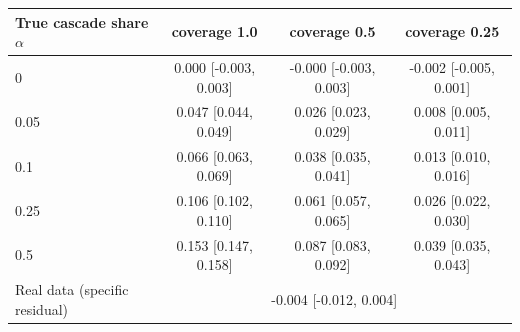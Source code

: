 \begin{tabular}{lccc}
\toprule
True cascade share $\alpha$ & coverage 1.0 & coverage 0.5 & coverage 0.25 \\
\midrule
0 & 0.000 [-0.003, 0.003] & -0.000 [-0.003, 0.003] & -0.002 [-0.005, 0.001] \\
0.05 & 0.047 [0.044, 0.049] & 0.026 [0.023, 0.029] & 0.008 [0.005, 0.011] \\
0.1 & 0.066 [0.063, 0.069] & 0.038 [0.035, 0.041] & 0.013 [0.010, 0.016] \\
0.25 & 0.106 [0.102, 0.110] & 0.061 [0.057, 0.065] & 0.026 [0.022, 0.030] \\
0.5 & 0.153 [0.147, 0.158] & 0.087 [0.083, 0.092] & 0.039 [0.035, 0.043] \\
\midrule
Real data (specific residual) & \multicolumn{3}{c}{-0.004 [-0.012, 0.004]} \\
\bottomrule
\end{tabular}